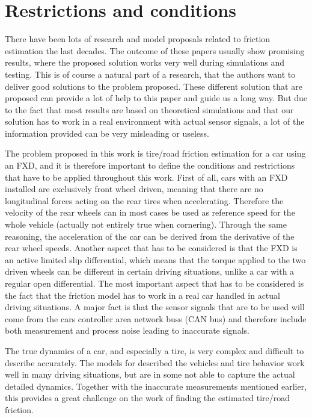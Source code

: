 \section{Restrictions and conditions}
There have been lots of research and model proposals related to friction estimation the last decades. The outcome of these papers usually show promising results, where the proposed solution works very well during simulations and testing. This is of course a natural part of a research, that the authors want to deliver good solutions to the problem proposed. These different solution that are proposed can provide a lot of help to this paper and guide us a long way. But due to the fact that most results are based on theoretical simulations and that our solution has to work in a real environment with actual sensor signals, a lot of the information provided can be very misleading or useless. 

The problem proposed in this work is tire/road friction estimation for a car using an FXD, and it is therefore important to define the conditions and restrictions that have to be applied throughout this work. First of all, cars with an FXD installed are exclusively front wheel driven, meaning that there are no longitudinal forces acting on the rear tires when accelerating. Therefore the velocity of the rear wheels can in most cases be used as reference speed for the whole vehicle (actually not entirely true when cornering). Through the same reasoning, the acceleration of the car can be derived from the derivative of the rear wheel speeds. Another aspect that has to be considered is that the FXD is an active limited slip differential, which means that the torque applied to the two driven wheels can be different in certain driving situations, unlike a car with a regular open differential. The most important aspect that has to be considered is the fact that the friction model has to work in a real car handled in actual driving situations. A major fact is that the sensor signals that are to be used  will come from the cars controller area network buss (CAN bus) and therefore include both measurement and process noise leading to inaccurate signals. 

The true dynamics of a car, and especially a tire, is very complex and difficult to describe accurately. The models for described the vehicles and tire behavior work well in many driving situations, but are in some not able to capture the actual detailed dynamics. Together with the inaccurate measurements mentioned earlier, this provides a great challenge on the work of finding the estimated tire/road friction. 

